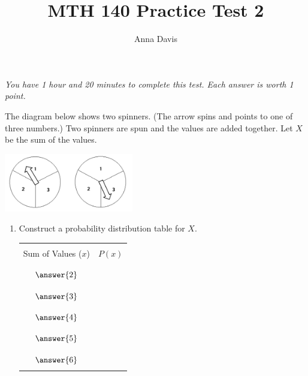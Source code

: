 \documentclass{ximera}
\author{Anna Davis} \title{MTH 140 Practice Test 2}
\begin{document}
\begin{abstract}

\end{abstract}
\maketitle
 \textit{You have 1 hour and 20 minutes to complete this test.  Each answer is worth 1 point.}
\begin{problem}\label{prob:test2prob1}
The diagram below shows two spinners.  (The arrow spins and points to one of three numbers.)  Two spinners are spun and the values are added together.  Let $X$ be the sum of the values.  

\begin{image}
   
\includegraphics[height=1in]{test2pic1.jpg}~
 
\end{image}



\begin{enumerate}
    \item Construct a probability distribution table for $X$.
    
    \begin{center}
\begin{tabular}{|c|c|}
 \hline
 &   \\
 Sum of Values ($x$) & $P(x)$ \\
 &  \\
  \hline
  & \\
 \quad $\answer{2}$\quad& \\
  & \\
 \hline
  & \\
 \quad $\answer{3}$ & \\
  & \\
 \hline
  & \\
  \quad $\answer{4}$ & \\
  & \\
 \hline
  & \\
 \quad $\answer{5}$  & \\
  &\\
 \hline
  & \\
 \quad $\answer{6}$  & \\
  &\\
 \hline
\end{tabular}
\end{center}
    

\end{enumerate}
\end{problem}
\end{document}
